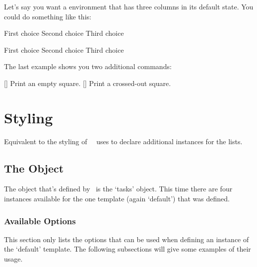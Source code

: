 \documentclass[load-preamble+]{cnltx-doc}
\newcommand*\correct{\PrintSolutionsTF{\checkedchoicebox}{\choicebox}}
\begin{document}
Let's say you want a  environment that has three columns
in its default state.  You could do something like this:
\begin{example}
  \begin{question}
    \begin{multiplechoice}
      \choice First choice
      \choice Second choice
      \choice[\correct] Third choice
    \end{multiplechoice}
  \end{question}
  \begin{solution}[print]
    \begin{multiplechoice}
      \choice First choice
      \choice Second choice
      \choice[\correct] Third choice
    \end{multiplechoice}
  \end{solution}
\end{example}

The last example shows you two additional commands:
\begin{commands}
  [\quad\choicebox]
    Print an empty square.
  [\quad\checkedchoicebox]
    Print a crossed-out square.
\end{commands}


\section{Styling \Tasks}
Equivalent to the styling of \ExSheets\ \Tasks\ uses  to
declare additional instances for the lists.

\subsection{The  Object}\label{sec:tasks}
The object that's defined by \Tasks\ is the `tasks' object.  This time there
are four instances available for the one template (again `default') that was
defined.

\subsubsection{Available Options}
This section only lists the options that can be used when defining an instance
of the `default' template.  The following subsections will give some examples
of their usage.
\end{document}
